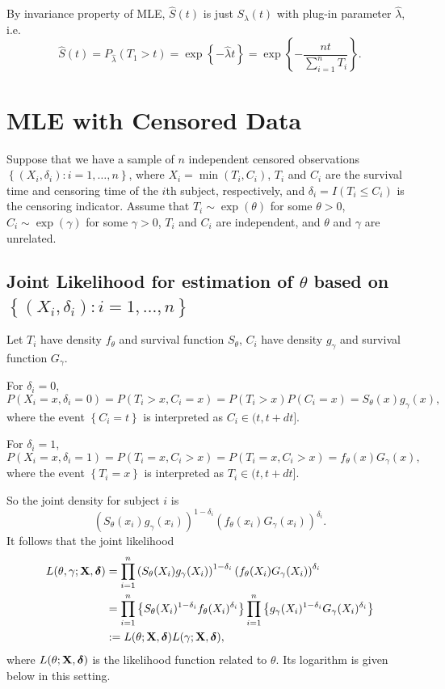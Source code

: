 \documentclass[11pt]{article}
\newcommand{\hS}{\hat{S}}
\newcommand{\hlam}{\hat{\lambda}}
\newcommand{\bX}{{\bf{X}}}
\newcommand{\bdelta}{{\bm \delta}}
\begin{document}
By invariance property of MLE, $\hS(t)$ is just $S_{\lambda}(t)$ with plug-in parameter $\hlam$, i.e.
\begin{equation*}
\hS(t) = P_{\hlam}(T_1> t) = \exp\left\{-\hlam t\right\} = \exp\left\{- \frac{nt}{\sum_{i=1}^nT_i}\right\}.
\end{equation*}

\section{MLE with Censored Data}

Suppose that we have a sample of $n$ independent censored observations $\left\{
  (X_i,\delta_i): i=1,\dots,n \right\}$, where $X_i = \min (T_i,C_i)$, $T_i$ and
$C_i$ are the survival time and censoring time of the $i$th subject,
respectively, and $\delta_i = I(T_i\leq C_i)$ is the censoring indicator.
Assume that $T_i\sim \exp(\theta)$ for some $\theta>0$, $C_i\sim \exp (\gamma)$
for some $\gamma>0$, $T_i$ and $C_i$ are independent, and $\theta$ and $\gamma$
are unrelated.

\subsection{Joint Likelihood for estimation of $\theta$ based on $\left\{
  (X_i,\delta_i): i=1,\dots,n \right\}$}

Let $T_i$ have density $f_{\theta}$ and survival function $S_{\theta}$, $C_i$
have density $g_{\gamma}$ and survival function $G_{\gamma}$.

For $\delta_i=0$,
\begin{equation*}
P(X_i=x,\delta_i=0) = P(T_i>x, C_i=x)=P(T_i>x)P(C_i=x) = S_{\theta}(x)g_{\gamma}(x),
\end{equation*}
where the event $\left\{ C_i=t \right\}$ is interpreted as $C_i\in (t,t+dt]$.

For $\delta_i=1$,
\begin{equation*}
P(X_i=x, \delta_i=1) = P(T_i=x, C_i>x) = P(T_i=x, C_i>x) = f_{\theta}(x)G_{\gamma}(x),
\end{equation*}
where the event $\left\{ T_i=x \right\}$ is interpreted as $T_i\in (t,t+dt]$.

So the joint density for subject $i$ is
\begin{equation*}
\left( S_{\theta}(x_i)g_{\gamma}(x_i) \right)^{1-\delta_i}\left( f_{\theta}(x_i)G_{\gamma}(x_i) \right)^{\delta_i}.
\end{equation*}
It follows that the joint likelihood
\begin{align*}
  L(\theta,\gamma;\bX,\bdelta) &= \prod_{i=1}^n \left( S_{\theta}(X_i)g_{\gamma}(X_i) \right)^{1-\delta_i}\left( f_{\theta}(X_i)G_{\gamma}(X_i) \right)^{\delta_i}\\
  &= \prod_{i=1}^n \left\{ S_{\theta}(X_i)^{1-\delta_i}f_{\theta}(X_i)^{\delta_i} \right\} \prod_{i=1}^n \left\{ g_{\gamma}(X_i)^{1-\delta_i} G_{\gamma}(X_i)^{\delta_i} \right\}\\
  &:= L(\theta;\bX,\bdelta) L(\gamma;\bX,\bdelta),
\end{align*}
where $L(\theta;\bX,\bdelta)$ is the likelihood function related to $\theta$.
Its logarithm is given below in this setting.
\end{document}
